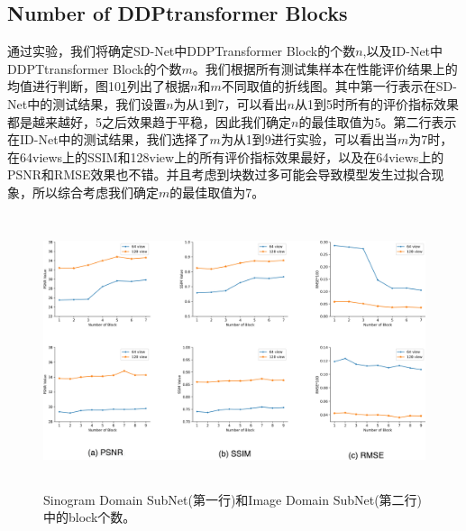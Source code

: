 \subsection{Number of DDPtransformer Blocks}
通过实验，我们将确定SD-Net中DDPTransformer Block的个数$n$,以及ID-Net中DDPTtransformer Block的个数$m$。我们根据所有测试集样本在性能评价结果上的均值进行判断，图10\ref{fig10}列出了根据$n$和$m$不同取值的折线图。其中第一行表示在SD-Net中的测试结果，我们设置$n$为从1到7，可以看出$n$从1到5时所有的评价指标效果都是越来越好，5之后效果趋于平稳，因此我们确定$n$的最佳取值为5。第二行表示在ID-Net中的测试结果，我们选择了$m$为从1到9进行实验，可以看出当$m$为7时，在64views上的SSIM和128view上的所有评价指标效果最好，以及在64views上的PSNR和RMSE效果也不错。并且考虑到块数过多可能会导致模型发生过拟合现象，所以综合考虑我们确定$m$的最佳取值为7。\par
\begin{figure}
	\centering
	\includegraphics[height=8cm,width=15cm]{12.eps}
	\caption{Sinogram Domain SubNet(第一行)和Image Domain SubNet(第二行)中的block个数。}
	\label{fig10}
\end{figure}
